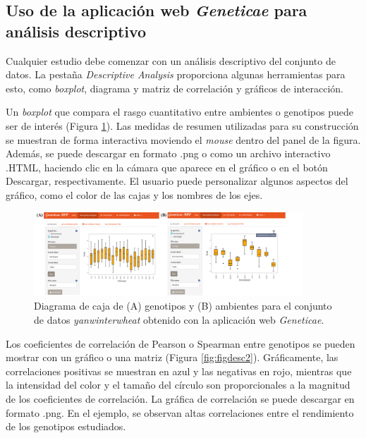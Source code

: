 \hspace{1cm}

\subsection{Uso de la aplicación web \emph{Geneticae} para análisis descriptivo}

Cualquier estudio debe comenzar con un análisis descriptivo del conjunto de datos. La pestaña \emph{Descriptive Analysis} proporciona algunas herramientas para esto, como  \emph{boxplot}, diagrama y matriz de correlación y gráficos de interacción.

Un \emph{boxplot} que compara el rasgo cuantitativo entre ambientes o genotipos puede ser de interés (Figura \ref{fig:figdesc1}). Las medidas de resumen utilizadas para su construcción se muestran de forma interactiva moviendo el \emph{mouse} dentro del panel de la figura. Además, se puede descargar en formato .png o como un archivo interactivo .HTML, haciendo clic en la cámara que aparece en el gráfico o en el botón Descargar, respectivamente. El usuario puede personalizar algunos aspectos del gráfico, como el color de las cajas y los nombres de los ejes. 

\begin{figure}[h]
	\begin{center}
		\includegraphics[width=0.9\textwidth]{./Graficos/www/boxplot.png}
	\end{center}
	\caption{Diagrama de caja de (A) genotipos y (B) ambientes para el conjunto de datos \emph{yanwinterwheat} obtenido con la aplicación web \emph{Geneticae}.}
	\label{fig:figdesc1}
\end{figure}

Los coeficientes de correlación de Pearson o Spearman entre genotipos se pueden mostrar con un gráfico o una matriz (Figura \ref{fig:figdesc2}). Gráficamente, las correlaciones positivas se muestran en azul y las negativas en rojo, mientras que la intensidad del color y el tamaño del círculo son proporcionales a la magnitud de los coeficientes de correlación. La gráfica de correlación se puede descargar en formato .png. En el ejemplo, se observan altas correlaciones entre el rendimiento de los genotipos estudiados. 

